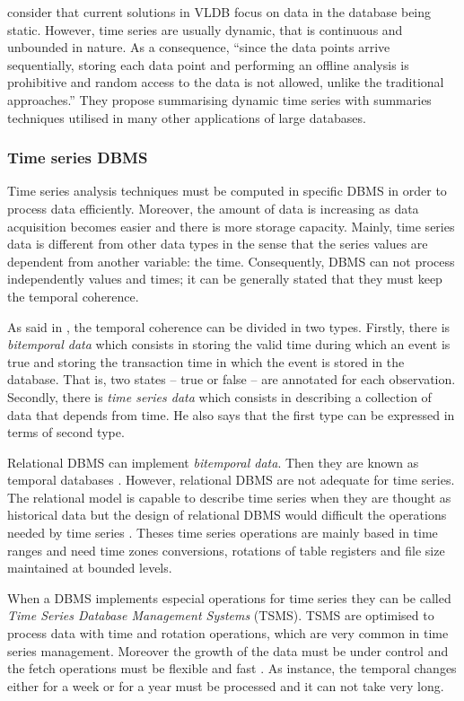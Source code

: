 \textcite{ogras06}  consider that current solutions in VLDB focus on data in the database being static. However, time series are usually dynamic, that is continuous and unbounded in nature. As a consequence, ``since the data points arrive sequentially, storing each data point and performing an offline analysis is prohibitive and random access to the data is not allowed, unlike the traditional approaches.'' They propose summarising dynamic time series with summaries techniques utilised in many other applications of large databases.
       


\subsubsection{Time series DBMS}

Time series analysis techniques must be computed in specific DBMS in order to process data efficiently. Moreover, the amount of data is increasing as data acquisition becomes easier and there is more storage capacity. 
Mainly, time series data is different from other data types in the sense that the series values are dependent from another variable: the time. Consequently, DBMS can not process independently values and times; it can be generally stated that they must keep the temporal coherence. 


As said in \textcite{assfalg08:thesis}, the temporal coherence can be divided in two types. Firstly, there is  \emph{bitemporal data} which consists in storing the valid time during which an event is true and storing the transaction time in which the event is stored in the database. That is, two states -- true or false -- are annotated for each observation.  Secondly, there is \emph{time series data} which consists in describing a collection of data that depends from time. He also says that the first type can be expressed in terms of second type.

Relational DBMS can implement \emph{bitemporal data}. Then they are known as temporal databases \parencite[ch.\ 22]{date}. However, relational DBMS are not adequate for time series. The relational model is capable to describe time series when they are thought as historical data but the design of relational DBMS would difficult the operations  needed by time series \parencite{schmidt95}. Theses time series operations are mainly based in time ranges and need time zones conversions, rotations of table registers and file size maintained at bounded levels.

When a DBMS implements especial operations for time series they can be called \emph{Time Series Database Management Systems} (TSMS). TSMS are optimised to process data with time and rotation operations, which are very common in time series management. Moreover the growth of the data must be under control and the fetch operations must be flexible and fast \parencite{keogh10:isax}. As instance, the temporal changes either for a week or for a year must be processed and it can not take very long.

